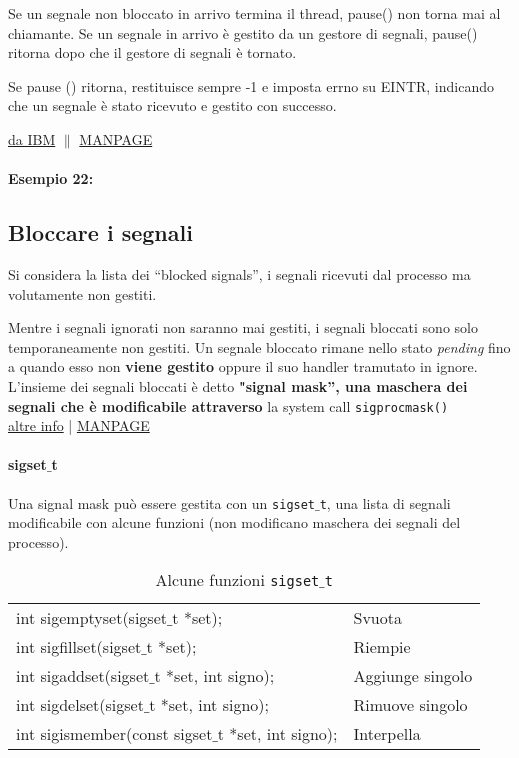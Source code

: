Se un segnale non bloccato in arrivo termina il thread, pause() non torna mai al chiamante. Se un segnale in arrivo è gestito da un gestore di segnali, pause() ritorna dopo che il gestore di segnali è tornato.

Se pause () ritorna, restituisce sempre -1 e imposta errno su EINTR, indicando che un segnale è stato ricevuto e gestito con successo.

\href{https://www.ibm.com/docs/en/zos/2.1.0?topic=functions-pause-suspend-process-pending-signal}{da IBM} $\|$ \href{https://man7.org/linux/man-pages/man2/pause.2.html}{MANPAGE}

\paragraph{Esempio 22:}\hfill \break


\subsection{Bloccare i segnali}
Si considera la lista dei “blocked signals”, i segnali ricevuti dal processo ma volutamente non gestiti.

Mentre i segnali ignorati non saranno mai gestiti, i segnali bloccati sono solo temporaneamente non gestiti. Un segnale bloccato rimane nello stato \textit{pending} fino a quando esso non \textbf{viene gestito} oppure il suo handler tramutato in ignore. L'insieme dei segnali bloccati è detto \textbf{"signal mask”, una maschera dei segnali che è modificabile attraverso} la system call \texttt{sigprocmask()}\\ \href{https://www.gnu.org/software/libc/manual/html_node/Process-Signal-Mask.html}{altre info} | \href{https://www.man7.org/linux/man-pages/man2/sigprocmask.2.html}{MANPAGE}

\paragraph{sigset$\_$t} 
Una signal mask può essere gestita con un \texttt{sigset$\_$t}, una lista di segnali modificabile con alcune funzioni (non modificano maschera dei segnali del processo).
\begin{table}[ht]
    \begin{tabular}{l|l}\textbf{}
int sigemptyset(sigset$\_$t *set); & Svuota \\
int sigfillset(sigset$\_$t *set);  & Riempie \\
int sigaddset(sigset$\_$t *set, int signo); & Aggiunge singolo  \\
int sigdelset(sigset$\_$t *set, int signo); & Rimuove singolo \\
int sigismember(const sigset$\_$t *set, int signo); & Interpella
\end{tabular}
    \caption{Alcune funzioni \texttt{sigset$\_$t}}
\end{table}

